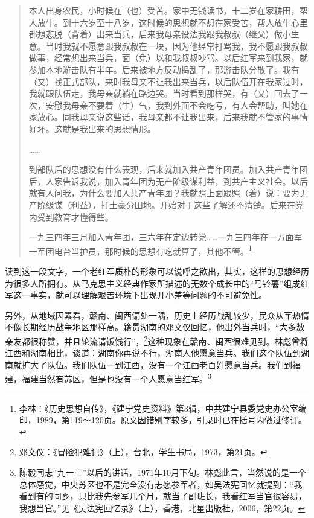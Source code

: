 \begin{quote}

本人出身农民，小时候在（也）受苦。家中无钱读书，十二岁在家耕田，帮人放牛。到十六岁至十八岁，这时候的思想就不想在家受苦，帮人放牛心里都想悲脱（背着）出来当兵，后来我母亲设法我跟我叔叔（继父）做小生意。当时我就不愿意跟我叔叔在一块，因为他经常打骂我，我不愿跟我叔叔做事，经常想出来当兵，面（免）以和我叔叔吵骂。以后红军来到我家，就参加本地游击队有半年。后来被地方反动捣乱了，那游击队分散了。我有（又）找正式部队，来时我母亲不让我出来当兵，以后队伍开在我家过时，我就跟队伍走，我母亲就躺在路边哭。当时看到那样哭，有（又）回去了一次，安慰我母亲不要着（生）气，我到外面不会吃亏，有人会帮助，叫她在家放心。同我母亲说这些话，我母亲都不让我出来，后来我就不管家的事情好坏。这就是我出来的思想情形。

……

到部队后的思想没有什么表现，后来就加入共产青年团员。加入共产青年团后，人家告诉我说，加入青年团为无产阶级谋利益，到共产主义社会。以后就有人问我，为什么要加入共产青年团？我就照上面跟照（着）说：要为无产阶级谋（利益），打土豪分田地。开始对于这些了解还不清楚。后来在党内受到教育才懂得些。

一九三四年三月加入青年团，三六年在定边转党……一九三四年在一方面军一军团电台当护员，那时候的思想有吃就算了，其他不管。\footnote{李林：《历史思想自传》，《建宁党史资料》第3辑，中共建宁县委党史办公室编印，1989，第119～120页。原文因错别字较多，引录时已在括号内做过修订。}
\end{quote}


读到这一段文字，一个老红军质朴的形象可以说呼之欲出，其实，这样的思想经历为很多人所拥有。从马克思主义经典作家所描述的无数个成长中的“马铃薯”组成红军这一事实，就可以理解艰苦环境下出现开小差等问题的不可避免性。


另外，从地域因素看，赣南、闽西偏处一隅，历史上经历战乱较少，民众从军热情不像长期经历战争地区那样高。籍贯湖南的邓文仪回忆，他出外当兵时，“大多数亲友都很称赞，并且轮流请饭饯行”，\footnote{邓文仪：《冒险犯难记》（上），台北，学生书局，1973，第21页。}这种现象在赣南、闽西很难见到。林彪曾将江西和湖南相比，谈道：湖南你再说不行，湖南人他愿意当兵。我们这个队伍到湖南就扩大了队伍。我们队伍一到江西，没有一个江西老百姓愿意当兵。我们到福建，福建当然有苏区，但是也没有一个人愿意当红军。\footnote{陈毅同志“九一三”以后的讲话，1971年10月下旬。林彪此言，当然说的是一个总体感觉，中央苏区也不是完全没有志愿参军者，如吴法宪回忆就提到：“我看到有的同乡，只比我先参军几个月，就当了副班长，我看红军当官很容易，我想当官。”见《吴法宪回忆录》（上），香港，北星出版社，2006，第22页。}


